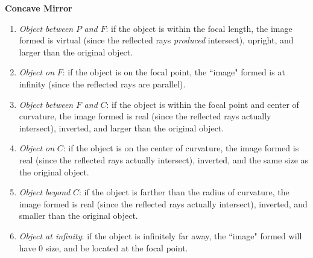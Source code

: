 \documentclass{scrartcl}
\begin{document}
    \quad\textbf{Concave Mirror}
    \begin{enumerate}
        \item \textit{Object between} $P$ \textit{and} $F$: if the object is within the focal length, the image formed is virtual (since the reflected rays \textit{produced} intersect), upright, and larger than the original object.
        \item \textit{Object on} $F$: if the object is on the focal point, the ``image" formed is at infinity (since the reflected rays are parallel).
        \item \textit{Object between} $F$ \textit{and} $C$: if the object is within the focal point and center of curvature, the image formed is real (since the reflected rays actually intersect), inverted, and larger than the original object.
        \item \textit{Object on} $C$: if the object is on the center of curvature, the image formed is real (since the reflected rays actually intersect), inverted, and the same size as the original object.
        \item \textit{Object beyond} $C$: if the object is farther than the radius of curvature, the image formed is real (since the reflected rays actually intersect), inverted, and smaller than the original object.
        \item \textit{Object at infinity}: if the object is infinitely far away, the ``image" formed will have 0 size, and be located at the focal point.
    \end{enumerate}
\end{document}

